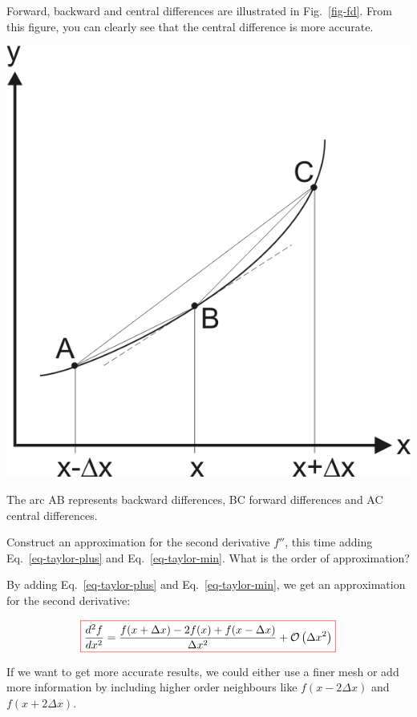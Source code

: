 Forward, backward and central differences are illustrated in Fig.~\ref{fig-fd}. From this figure, you can clearly see that the central difference is more accurate.

\begin{marginfigure}
\centering
\includegraphics{numeric/figures/fd}
\caption{The arc AB represents backward differences, BC forward differences and AC central differences.}
\label{fig-fd}
\end{marginfigure}

\begin{cue}
Construct an approximation for the second derivative $f''$, this time adding Eq.~\ref{eq-taylor-plus} and Eq.~\ref{eq-taylor-min}. What is the order of approximation? 
\end{cue}

By adding Eq.~\ref{eq-taylor-plus} and Eq.~\ref{eq-taylor-min}, we get an approximation for the second derivative:

\begin{equation}
\fbox{$\displaystyle
\frac{d^2 f}{d x^2} = \frac{f(x + \Delta x) -2 f(x) + f(x- \Delta x)}{ \Delta x^2} + \mathcal{O}\left(\Delta x^2\right)
$}
\end{equation} 

If we want to get more accurate results, we could either use a finer mesh or add more information by including higher order neighbours like $f(x-2\Delta x)$ and $f(x+2\Delta x)$.

